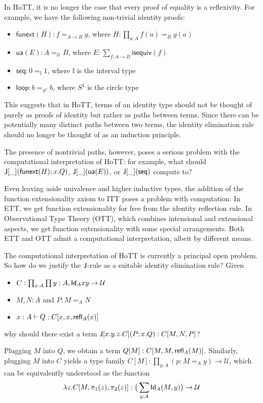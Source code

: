 \documentclass[12pt]{article}
\newcommand{\iseq}{\mathsf{isequiv}}
\newcommand{\seq}{\mathsf{seq}}
\newcommand{\lp}{\mathsf{loop}}
\begin{document}
In HoTT, it is no longer the case that every proof of equality is a reflexivity. For example, we have the following non-trivial identity proofs:

\begin{itemize}
\item $\mathsf{funext}(H): f =_{A\to B} g$, where $H : \prod_{a:A} f(a) =_B g(a)$
\item $\mathsf{ua}(E): A =_{\mathcal{U}} B$, where $E : \sum_{f:A\to B}\iseq(f)$
\item $\seq: 0 =_{\mathbb{I}} 1$, where $\mathbb{I}$ is the interval type
\item $\lp: b =_{S^1} b$, where $S^1$ is the circle type
\end{itemize}

This suggests that in HoTT, terms of an identity type should not be thought of purely as proofs of identity but rather as paths between terms. Since there can be potentially many distinct paths between two terms, the identity elimination rule should no longer be thought of as an induction principle.

The presence of nontrivial paths, however, poses a serious problem with the computational interpretation of HoTT: for example, what should $\mathsf{J}[\_](\mathsf{funext}(H);x.Q)$, $\mathsf{J}[\_](\mathsf{ua}(E))$, or $\J[\_](\seq)$ compute to?

Even leaving aside univalence and higher inductive types, the addition of the function extensionality axiom to ITT poses a problem with computation. In ETT, we get function extensionality for free from the identity reflection rule. In Observational Type Theory (OTT), which combines intensional and extensional aspects, we get function extensionality with some special arrangements. Both ETT and OTT admit a computational interpretation, albeit by different means.

The computational interpretation of HoTT is currently a principal open problem. So how do we justify the $\mathsf{J}$-rule as a suitable identity elimination rule? Given

\begin{itemize}
\item $C : \prod_{x : A} \prod{y : A}, \mathsf{Id}_{A}{x}{y} \to \mathcal{U}$
\item $M,N:A$ and $P:M=_A N$
\item $x:A\vdash Q:C[x,x,\mathsf{refl}_{A}(x)]$
\end{itemize}
why should there exist a term $\mathsf{J}[x.y.z.C](P;x.Q):C[M,N,P]$?

Plugging $M$ into $Q$, we obtain a term $Q[M]:C[M,M,\mathsf{refl}_{A}(M)]$. Similarly, plugging $M$ into $C$ yields a type family $C[M] : \prod_{y:A}(p:M=_A y)\to\mathcal{U}$, which can be equivalently understood as the function \[\lambda z. C[M, \pi_1(z), \pi_2(z)] : \big(\sum_{y:A} \mathsf{Id}_{A}(M,y)\big)\to\mathcal{U} \]
\end{document}
